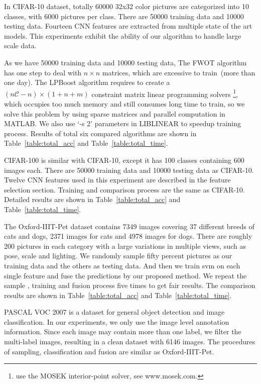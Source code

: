 \documentclass[10pt,twocolumn,letterpaper]{article}
\def\calC{{\mathcal{C}}}
\begin{document}
In CIFAR-10 dataset, totally 60000 32x32 color pictures are categorized into 10 classes, with 6000 pictures per class.
There are 50000 training data and 10000 testing data.
Fourteen CNN features are extracted from multiple state of the art models.
This experiments exhibit the ability of our algorithm to handle large scale data.

As we have 50000 training data and 10000 testing data,
The FWOT algorithm has one step to deal with $n\times n$ matrices, which are excessive to train~(more than one day).
The LPBoost algorithm requires to create a $(n\calC - n) \times (1 + n + m)$ constraint matrix linear programming solvers
\footnote{\cite{gehler2009feature} use the MOSEK interior-point solver, see www.mosek.com.},
which occupies too much memory and still consumes long time to train,
so we solve this problem by using sparse matrices and parallel computation in MATLAB.
We also use `-s 2' parameters in LIBLINEAR to speedup training process.
Results of total six compared algorithms are shown in Table~\ref{table:total_acc} and Table~\ref{table:total_time}.


CIFAR-100 is similar with CIFAR-10, except it has 100 classes containing 600 images each.
There are 50000 training data and 10000 testing data as CIFAR-10.
Twelve CNN features used in this experiment are described in the feature selection section.
Training and comparison process are the same as CIFAR-10.
Detailed results are shown in Table~\ref{table:total_acc} and Table~\ref{table:total_time}.


The Oxford-IIIT-Pet dataset contains 7349 images covering 37 different breeds of cats and dogs, 2371 images for cats and 4978 images for dogs.
There are roughly 200 pictures in each category with a large variations in multiple views, such as pose, scale and lighting.
We randomly sample fifty percent pictures as our training data and the others as testing data.
And then we train svm on each single feature and fuse the predictions by our proposed method.
We repeat the sample , training and fusion process five times to get fair results.
The comparison results are shown in Table~\ref{table:total_acc} and Table~\ref{table:total_time}.

PASCAL VOC 2007 is a dataset for general object detection and image classification.
In our experiments, we only use the image level annotation information.
Since each image may contain more than one label, we filter the multi-label images, resulting in a clean dataset with 6146 images.
The procedures of sampling, classification and fusion are similar as Oxford-IIIT-Pet.
\end{document}
